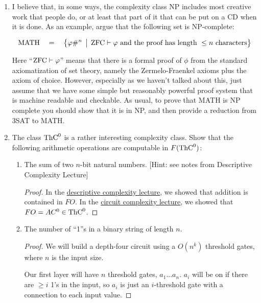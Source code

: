 \documentclass[12pt]{article}
\begin{document}
\noindent{}
\addtocounter{section}{1}

\begin{enumerate}

\item I believe that, in some ways, the complexity class NP includes most creative work that
  people do, or at least that part of it that can be put on a CD when it is
  done.  As an example, argue that the following set is NP-complete:

  \[ \mbox{MATH}\quad =\quad \bigl\{ \varphi \#^n \,\bigm|\, \mbox{ZFC}\vdash\varphi \mbox{ and the
      proof has length } \leq n \mbox{ characters} \bigr\}\]

  Here ``$\mbox{ZFC}\vdash\varphi$'' means that there is a formal proof of $\phi$ from the standard
  axiomatization
  of set theory, namely the Zermelo-Fraenkel axioms plus the axiom of choice.  However, especially as
  we haven't talked about this, just assume that we have some simple but reasonably powerful
  proof system that is machine readable and checkable.  As usual, to prove that MATH is NP complete
  you should show that it is in NP, and then provide a reduction from 3SAT to MATH.


\item The class $\mbox{{\rm ThC}}^0$ is a rather interesting complexity class.  Show
  that the following arithmetic operations are computable in $F(\mbox{{\rm ThC}}^0)$:
  \begin{enumerate}
  \item The sum of two $n$-bit natural numbers.  [Hint: see notes from Descriptive Complexity Lecture]

    \begin{proof}
      In the \href{https://people.cs.umass.edu/~immerman/cs601/lect7.pdf}{descriptive complexity lecture}, we showed that addition is contained in $FO$. In the \href{https://people.cs.umass.edu/~immerman/cs601/lect12.pdf}{circuit complexity lecture}, we showed that $FO = AC^0 \in \mbox{{\rm ThC}}^0$.
    \end{proof}

  \item The number of ``1''s in a binary string of length $n$.

    \begin{proof}
      We will build a depth-four circuit using a $O(n^k)$ threshold gates, where $n$ is the input size.

      Our first layer will have $n$ threshold gates, $a_1...a_n$. $a_i$ will be on if there are $\geq i$ 1's in the input, so $a_i$ is just an $i$-threshold gate with a connection to each input value.


\end{proof}
\end{enumerate}
\end{enumerate}
\end{document}
